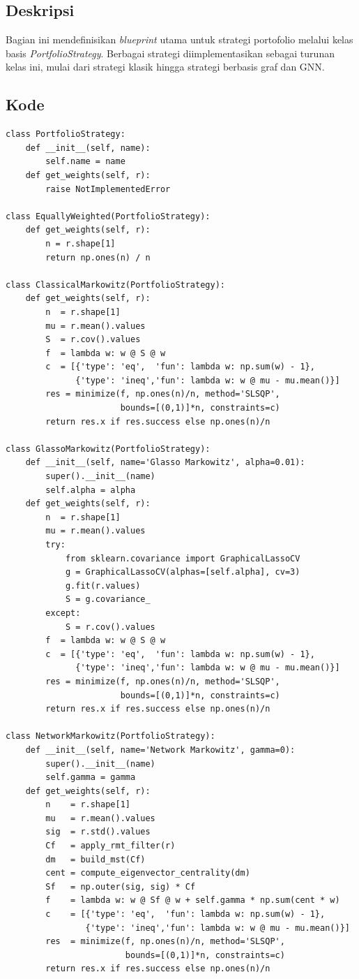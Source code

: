 \documentclass[12pt,a4paper]{article}
\begin{document}
\subsection{Deskripsi}
Bagian ini mendefinisikan \textit{blueprint} utama untuk strategi portofolio melalui kelas basis \textit{PortfolioStrategy}. Berbagai strategi diimplementasikan sebagai turunan kelas ini, mulai dari strategi klasik hingga strategi berbasis graf dan GNN.

\subsection{Kode}
\begin{lstlisting}[caption={Implementasi berbagai strategi portofolio}]
class PortfolioStrategy:
    def __init__(self, name):
        self.name = name
    def get_weights(self, r):
        raise NotImplementedError

class EquallyWeighted(PortfolioStrategy):
    def get_weights(self, r):
        n = r.shape[1]
        return np.ones(n) / n

class ClassicalMarkowitz(PortfolioStrategy):
    def get_weights(self, r):
        n  = r.shape[1]
        mu = r.mean().values
        S  = r.cov().values
        f  = lambda w: w @ S @ w
        c  = [{'type': 'eq',  'fun': lambda w: np.sum(w) - 1},
              {'type': 'ineq','fun': lambda w: w @ mu - mu.mean()}]
        res = minimize(f, np.ones(n)/n, method='SLSQP',
                       bounds=[(0,1)]*n, constraints=c)
        return res.x if res.success else np.ones(n)/n

class GlassoMarkowitz(PortfolioStrategy):
    def __init__(self, name='Glasso Markowitz', alpha=0.01):
        super().__init__(name)
        self.alpha = alpha
    def get_weights(self, r):
        n  = r.shape[1]
        mu = r.mean().values
        try:
            from sklearn.covariance import GraphicalLassoCV
            g = GraphicalLassoCV(alphas=[self.alpha], cv=3)
            g.fit(r.values)
            S = g.covariance_
        except:
            S = r.cov().values
        f  = lambda w: w @ S @ w
        c  = [{'type': 'eq',  'fun': lambda w: np.sum(w) - 1},
              {'type': 'ineq','fun': lambda w: w @ mu - mu.mean()}]
        res = minimize(f, np.ones(n)/n, method='SLSQP',
                       bounds=[(0,1)]*n, constraints=c)
        return res.x if res.success else np.ones(n)/n

class NetworkMarkowitz(PortfolioStrategy):
    def __init__(self, name='Network Markowitz', gamma=0):
        super().__init__(name)
        self.gamma = gamma
    def get_weights(self, r):
        n    = r.shape[1]
        mu   = r.mean().values
        sig  = r.std().values
        Cf   = apply_rmt_filter(r)
        dm   = build_mst(Cf)
        cent = compute_eigenvector_centrality(dm)
        Sf   = np.outer(sig, sig) * Cf
        f    = lambda w: w @ Sf @ w + self.gamma * np.sum(cent * w)
        c    = [{'type': 'eq',  'fun': lambda w: np.sum(w) - 1},
                {'type': 'ineq','fun': lambda w: w @ mu - mu.mean()}]
        res  = minimize(f, np.ones(n)/n, method='SLSQP',
                        bounds=[(0,1)]*n, constraints=c)
        return res.x if res.success else np.ones(n)/n


\end{lstlisting}
\end{document}
